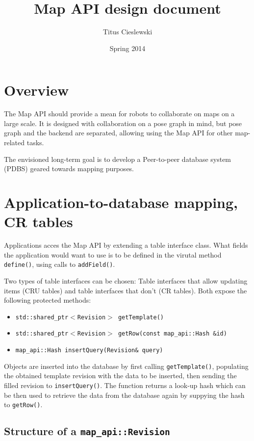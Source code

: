 \documentclass{article}
\title{Map API design document}
\author{Titus Cieslewski}
\date{Spring 2014}
\begin{document}
\maketitle

\section{Overview}

The Map API should provide a mean for robots to collaborate on maps on a large
scale. It is designed with collaboration on a pose graph in mind, but pose
graph and the backend are separated, allowing using the Map API for other
map-related tasks.

The envisioned long-term goal is to develop a Peer-to-peer database system
(PDBS) geared towards mapping purposes.

\section{Application-to-database mapping, CR tables}

Applications acces the Map API by extending a table interface class. What
fields the application would want to use is to be defined in the virutal
method {\tt define()}, using calls to {\tt addField()}.

Two types of table interfaces can be chosen: Table interfaces that allow
updating items (CRU tables) and table interfaces that don't (CR tables). 
Both expose the following protected methods:

\begin{itemize} \itemsep0em
  \item {\tt std::shared\_ptr$<$Revision$>$ getTemplate()}
  \item {\tt std::shared\_ptr$<$Revision$>$ getRow(const map\_api::Hash \&id)}
  \item {\tt map\_api::Hash insertQuery(Revision\& query)}
\end{itemize}

Objects are inserted into the database by first calling {\tt getTemplate()},
populating the obtained template revision with the data to be inserted, then 
sending
the filled revision to {\tt insertQuery()}. The function returns a look-up
hash which can be then used to retrieve the data from the database again by
suppying the hash to {\tt getRow()}.

\subsection{Structure of a {\tt map\_api::Revision}}
\end{document}
